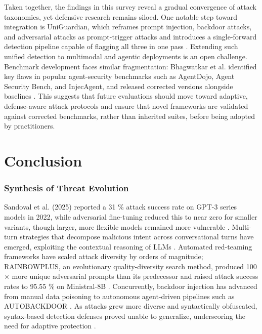\documentclass[11pt,a4paper]{article}
\begin{document}
Taken together, the findings in this survey reveal a gradual convergence of attack taxonomies, yet defensive research remains siloed. One notable step toward integration is UniGuardian, which reframes prompt injection, backdoor attacks, and adversarial attacks as prompt-trigger attacks and introduces a single-forward detection pipeline capable of flagging all three in one pass \cite{Lin_2025_Uniguardian_552288e3}. Extending such unified detection to multimodal and agentic deployments is an open challenge. Benchmark development faces similar fragmentation: Bhagwatkar et al. identified key flaws in popular agent-security benchmarks such as AgentDojo, Agent Security Bench, and InjecAgent, and released corrected versions alongside baselines \cite{Bhagwatkar_2025_Indirect_2ccd3225}. This suggests that future evaluations should move toward adaptive, defense-aware attack protocols and ensure that novel frameworks are validated against corrected benchmarks, rather than inherited suites, before being adopted by practitioners.

\section{Conclusion}

\subsubsection{Synthesis of Threat Evolution}

 Sandoval et al. (2025) reported a 31 \% attack success rate on GPT-3 series models in 2022, while adversarial fine-tuning reduced this to near zero for smaller variants, though larger, more flexible models remained more vulnerable \cite{Sandoval_2025_GPT_b45006a4}. Multi-turn strategies that decompose malicious intent across conversational turns have emerged, exploiting the contextual reasoning of LLMs \cite{Mo_2025_LLMs_eccb86af}. Automated red-teaming frameworks have scaled attack diversity by orders of magnitude; RAINBOWPLUS, an evolutionary quality-diversity search method, produced 100$\times$ more unique adversarial prompts than its predecessor and raised attack success rates to 95.55 \% on Ministral-8B \cite{Dang_2025_Rainbowplus_b158c5a2}. Concurrently, backdoor injection has advanced from manual data poisoning to autonomous agent-driven pipelines such as AUTOBACKDOOR \cite{Li_2025_LLM_29a3a9ff}. As attacks grew more diverse and syntactically obfuscated, syntax-based detection defenses proved unable to generalize, underscoring the need for adaptive protection \cite{Wang_2025_Promptsleuth_c8e9516a}.
\end{document}
